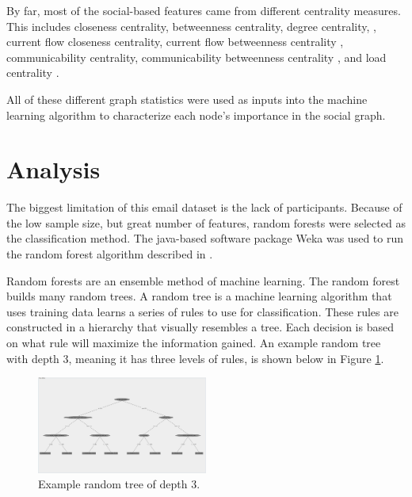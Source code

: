 \documentclass{article}
\begin{document}
\par
By far, most of the social-based features came from different centrality measures.  This includes closeness centrality, betweenness centrality, degree centrality, \cite{borgatti2011analyzing}, current flow closeness centrality, current flow betweenness centrality \cite{brandes2005centrality}, communicability centrality, communicability betweenness centrality \cite{estrada2008communicability}, and load centrality \cite{newman2001scientific}.
\par
All of these different graph statistics were used as inputs into the machine learning algorithm to characterize each node's importance in the social graph.


\section{Analysis} \label{Analysis}
The biggest limitation of this email dataset is the lack of participants.  Because of the low sample size, but great number of features, random forests were selected as the classification method.  The java-based software package Weka was used to run the random forest algorithm described in \cite{Breiman2001}.
\par
Random forests are an ensemble method of machine learning.  The random forest builds many random trees.  A random tree is a machine learning algorithm that uses training data learns a series of rules to use for classification.  These rules are constructed in a hierarchy that visually resembles a tree.  Each decision is based on what rule will maximize the information gained.  An example random tree with depth 3, meaning it has three levels of rules, is shown below in Figure \ref{fig:ex_tree}.
\begin{figure}[H]
    \centering
        \includegraphics[width=0.5\textwidth]{3_level_tree}
        \caption{Example random tree of depth 3.}
        \label{fig:ex_tree}
\end{figure}
\par
\end{document}

